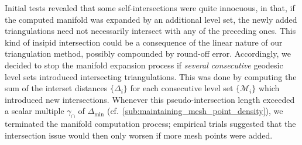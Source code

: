Initial tests revealed that some self-intersections were quite innocuous, in
that, if the computed manifold was expanded by an additional level set,
the newly added triangulations need not necessarily intersect with any of the
preceding ones. This kind of insipid intersection could be a consequence of
the linear nature of our triangulation method, possibly compounded by round-off
error. Accordingly, we decided to stop the manifold expansion process
if \emph{several consecutive} geodesic level sets introduced intersecting
triangulations. This was done by computing the sum of the interset distances
$\{\Delta_{i}\}$ for each consecutive level set $\{\mathcal{M}_{i}\}$ which
introduced new intersections. Whenever this pseudo-intersection length
exceeded a scalar multiple $\gamma_{\cap}$ of $\Delta_{\min}$ (cf.\
\cref{sub:maintaining_mesh_point_density}),
we terminated the manifold computation process; empirical trials suggested
that the intersection issue would then only worsen if more mesh points were
added.

